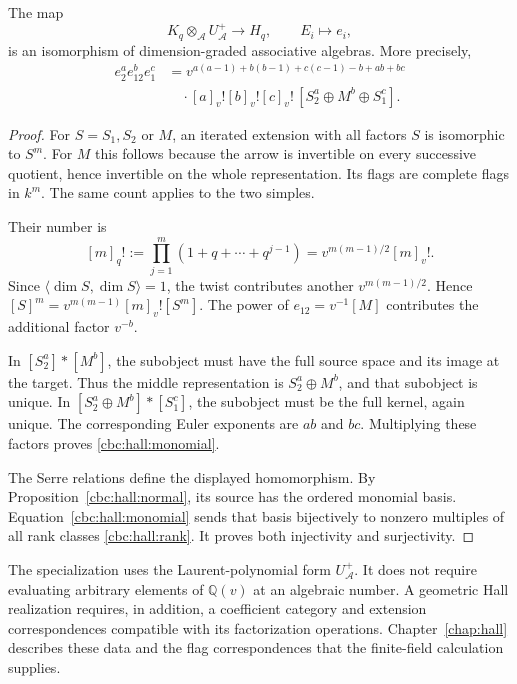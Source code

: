 \begin{theorem}\label{cbc:hall:realization}
The map
\[
 K_q\otimes_{\mathcal A}U_{\mathcal A}^+\longrightarrow H_q,
 \qquad E_i\longmapsto e_i,
\]
is an isomorphism of dimension-graded associative algebras.  More precisely,
\begin{equation}\label{cbc:hall:monomial}
\begin{aligned}
 e_2^a e_{12}^b e_1^c
 &=v^{a(a-1)+b(b-1)+c(c-1)-b+ab+bc}\\
 &\quad{}\cdot[a]_v![b]_v![c]_v!\,[S_2^a\oplus M^b\oplus S_1^c].
\end{aligned}
\end{equation}
\end{theorem}
\begin{proof}
For $S=S_1,S_2$ or $M$, an iterated extension with all factors $S$ is
isomorphic to $S^m$.  For $M$ this follows because the arrow is invertible
on every successive quotient, hence invertible on the whole representation.
Its flags are complete flags in $k^m$.  The same count applies to the two
simples.

Their number is
\[
 [m]_q!:=\prod_{j=1}^m(1+q+\cdots+q^{j-1})
 =v^{m(m-1)/2}[m]_v!.
\]
Since $\langle\dim S,\dim S\rangle=1$, the twist contributes another
$v^{m(m-1)/2}$.  Hence $[S]^m=v^{m(m-1)}[m]_v![S^m]$.
The power of $e_{12}=v^{-1}[M]$ contributes the additional factor $v^{-b}$.

In $[S_2^a]*[M^b]$, the subobject must have the full source space and its
image at the target.  Thus the middle representation is $S_2^a\oplus M^b$,
and that subobject is unique.  In
$[S_2^a\oplus M^b]*[S_1^c]$, the subobject must be the full kernel, again
unique.  The corresponding Euler exponents are $ab$ and $bc$.  Multiplying
these factors proves \eqref{cbc:hall:monomial}.

The Serre relations define the displayed homomorphism.  By
Proposition~\ref{cbc:hall:normal}, its source has the ordered monomial basis.
Equation~\eqref{cbc:hall:monomial} sends that basis bijectively to nonzero
multiples of all rank classes \eqref{cbc:hall:rank}.  It proves both
injectivity and surjectivity.
\end{proof}

The specialization uses the Laurent-polynomial form $U_{\mathcal A}^+$.
It does not require evaluating arbitrary elements of $\mathbb Q(v)$ at an
algebraic number.  A geometric Hall realization requires, in addition, a
coefficient category and extension correspondences compatible with its
factorization operations.  Chapter~\ref{chap:hall} describes these data and
the flag correspondences that the finite-field calculation supplies.

